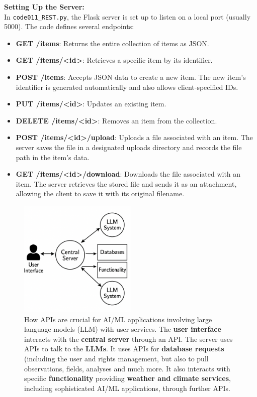 \textbf{Setting Up the Server:}\\
In \texttt{code011\_REST.py}, the Flask server is set up to listen on a local port (usually 5000). The code defines several endpoints:
\begin{itemize}
  \item \textbf{GET /items}: Returns the entire collection of items as JSON.
  \item \textbf{GET /items/<id>}: Retrieves a specific item by its identifier.
  \item \textbf{POST /items}: Accepts JSON data to create a new item. The new item’s identifier is generated automatically and also allows client-specified IDs.
  \item \textbf{PUT /items/<id>}: Updates an existing item.
  \item \textbf{DELETE /items/<id>}: Removes an item from the collection.
  \item \textbf{POST /items/<id>/upload}: Uploads a file associated with an item. The server saves the file in a designated uploads directory and records the file path in the item's data.
  \item \textbf{GET /items/<id>/download}: Downloads the file associated with an item. The server retrieves the stored file and sends it as an attachment, allowing the client to save it with its original filename.
\end{itemize}

\begin{center}
\begin{figure}[ht]
   \centerline{\includegraphics[width=0.5\textwidth]{images/user-server-database-llm.png}}
	\caption{How APIs are crucial for AI/ML applications involving large language models (LLM) with user services. The {\bf user interface} interacts with the {\bf central server} through an API. The server uses APIs to talk to the {\bf LLMs}. It uses APIs for {\bf database requests} (including the user and rights management, but also to pull observations, fields, analyses and much more. It also interacts with specific {\bf functionality} providing \textcolor{DWDblue}{\bf weather and climate services}, including sophisticated AI/ML applications, through further APIs.}
\end{figure}
\end{center}%

